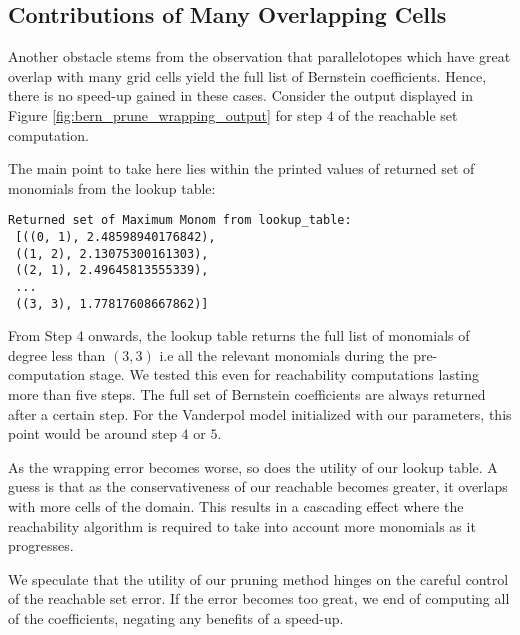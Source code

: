 \subsection{Contributions of Many Overlapping Cells}
Another obstacle stems from the observation that parallelotopes which have great overlap with many grid cells yield the full list of Bernstein coefficients. Hence, there is no speed-up gained in these cases. Consider the output displayed in Figure \ref{fig:bern_prune_wrapping_output} for step $4$ of the reachable set computation.

The main point to take here lies within the printed values of returned set of monomials from the lookup table:
%
\begin{verbatim}
Returned set of Maximum Monom from lookup_table:
 [((0, 1), 2.48598940176842),
 ((1, 2), 2.13075300161303),
 ((2, 1), 2.49645813555339),
 ...
 ((3, 3), 1.77817608667862)]
\end{verbatim}
%
From Step 4 onwards, the lookup table returns the full list of monomials of degree less than $(3,3)$ i.e all the relevant monomials during the pre-computation stage.
%
We tested this even for reachability computations lasting more than five steps. The full set of Bernstein coefficients are always returned after a certain step. For the Vanderpol model initialized with our parameters, this point would be around step $4$ or $5$.

As the wrapping error becomes worse, so does the utility of our lookup table. A guess is that as the conservativeness of our reachable becomes greater, it overlaps with more cells of the domain. This results in a cascading effect where the reachability algorithm is required to take into account more monomials as it progresses.

We speculate that the utility of our pruning method hinges on the careful control of the reachable set error. If the error becomes too great, we end of computing all of the coefficients, negating any benefits of a speed-up.
